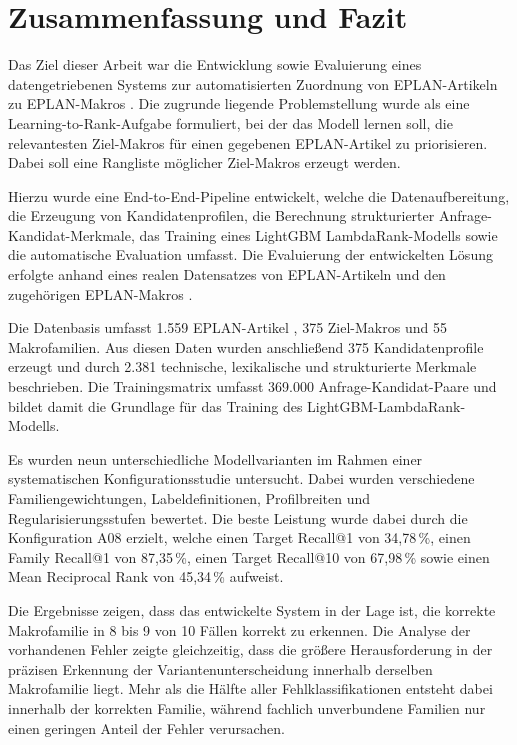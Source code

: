 \chapter{Zusammenfassung und Fazit}

Das Ziel dieser Arbeit war die Entwicklung sowie Evaluierung eines datengetriebenen Systems zur automatisierten Zuordnung von EPLAN-Artikeln \parencite{EPLANArtikelverwaltung} zu EPLAN-Makros \parencite{EPLAN-Makros}.
Die zugrunde liegende Problemstellung wurde als eine Learning-to-Rank-Aufgabe formuliert, bei der das Modell lernen soll, die relevantesten Ziel-Makros \parencite{EPLAN-Makros} für einen gegebenen EPLAN-Artikel \parencite{EPLANArtikelverwaltung} zu priorisieren.
Dabei soll eine Rangliste möglicher Ziel-Makros erzeugt werden.


Hierzu wurde eine End-to-End-Pipeline entwickelt, welche die Datenaufbereitung, die Erzeugung von Kandidatenprofilen, die Berechnung strukturierter Anfrage-Kandidat-Merkmale, 
das Training eines LightGBM LambdaRank-Modells sowie die automatische Evaluation umfasst.
Die Evaluierung der entwickelten Lösung erfolgte anhand eines realen Datensatzes von EPLAN-Artikeln \parencite{EPLANArtikelverwaltung} und den zugehörigen EPLAN-Makros \parencite{EPLAN-Makros}. 


Die Datenbasis umfasst 1.559 EPLAN-Artikel \parencite{EPLANArtikelverwaltung}, 375 Ziel-Makros \parencite{EPLAN-Makros} und 55 Makrofamilien.
Aus diesen Daten wurden anschließend 375 Kandidatenprofile erzeugt und durch 2.381 technische, lexikalische und strukturierte Merkmale beschrieben. 
Die Trainingsmatrix umfasst 369.000 Anfrage-Kandidat-Paare und bildet damit die Grundlage für das Training des LightGBM-LambdaRank-Modells.


Es wurden neun unterschiedliche Modellvarianten im Rahmen einer systematischen Konfigurationsstudie untersucht. 
Dabei wurden verschiedene Familiengewichtungen, Labeldefinitionen, Profilbreiten und Regularisierungsstufen bewertet.
Die beste Leistung wurde dabei durch die Konfiguration A08 erzielt, welche einen Target Recall@1 von 34,78\,\%, einen Family Recall@1 von 87,35\,\%, einen Target Recall@10 von 67,98\,\% sowie einen Mean Reciprocal Rank von 45,34\,\% aufweist.


Die Ergebnisse zeigen, dass das entwickelte System in der Lage ist, die korrekte Makrofamilie in 8 bis 9 von 10 Fällen korrekt zu erkennen.
Die Analyse der vorhandenen Fehler zeigte gleichzeitig, dass die größere Herausforderung in der präzisen Erkennung der Variantenunterscheidung innerhalb derselben Makrofamilie liegt.
Mehr als die Hälfte aller Fehlklassifikationen entsteht dabei innerhalb der korrekten Familie, während fachlich unverbundene Familien nur einen geringen Anteil der Fehler verursachen.


